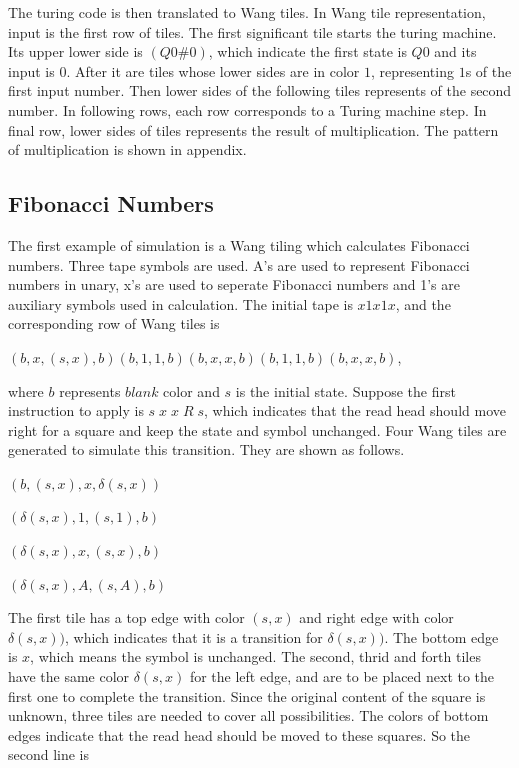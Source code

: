 \documentclass{article}
\begin{document}
The turing code is then translated to Wang tiles. In Wang tile representation, input is the first row of tiles. The first significant tile starts the turing machine. Its upper lower side is $(Q0\#0)$, which indicate the first state is $Q0$ and its input is $0$. After it are tiles whose lower sides are in color $1$, representing $1$s of the first input number. Then lower sides of the following tiles represents of the second number. In following rows, each row corresponds to a Turing machine step. In final row, lower sides of tiles represents the result of multiplication. The pattern of multiplication is shown in appendix. 


\subsection*{Fibonacci Numbers}
The first example of simulation is a Wang tiling which calculates Fibonacci numbers. Three tape symbols are used. A's are used to represent Fibonacci numbers in unary, x's are used to seperate Fibonacci numbers and 1's are auxiliary symbols used in calculation. The initial tape is $ x1x1x $, and the corresponding row of Wang tiles is 

$ (b, x, (s,x), b) (b, 1, 1, b) (b, x, x, b) (b, 1, 1, b) (b, x, x, b) $, 

where $ b $ represents $ blank $ color and $ s $ is the initial state. Suppose the first instruction to apply is $ s \; x \; x \; R \; s $, which indicates that the read head should move right for a square and keep the state and symbol unchanged. Four Wang tiles are generated to simulate this transition. They are shown as follows. 

$ (b, (s,x), x, \delta(s,x)) $

$ (\delta(s,x), 1, (s,1), b) $

$ (\delta(s,x), x, (s,x), b) $

$ (\delta(s,x), A, (s,A), b) $

The first tile has a top edge with color $ (s,x) $ and right edge with color $ \delta(s,x)) $, which indicates that it is a transition for $ \delta(s,x)) $. The bottom edge is $ x $, which means the symbol is unchanged. The second, thrid and forth tiles have the same color $ \delta(s,x) $ for the left edge, and are to be placed next to the first one to complete the transition. Since the original content of the square is unknown, three tiles are needed to cover all possibilities. The colors of bottom edges indicate that the read head should be moved to these squares. So the second line is 
\end{document}

